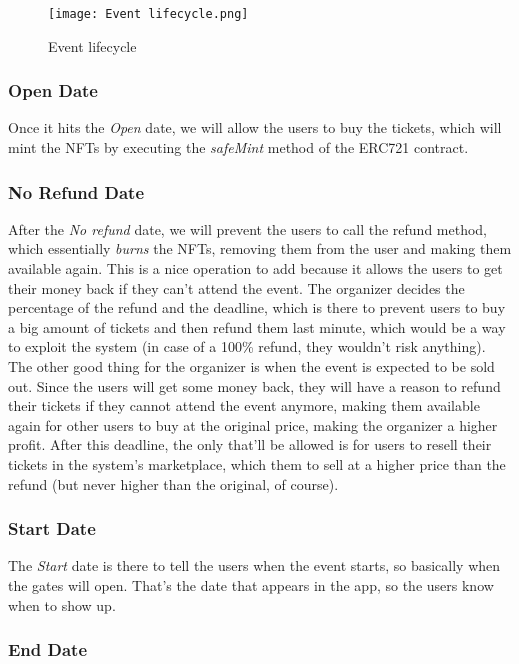 \begin{figure}[H]
    \texttt{[image: Event lifecycle.png]}
    \centering
    \caption{Event lifecycle}
    \label{fig:event_lifecycle}
\end{figure}

\subsubsection{Open Date}

Once it hits the \textit{Open} date, we will allow the users to buy the tickets, which will mint the NFTs by executing the \textit{safeMint} method of the ERC721 contract.

\subsubsection{No Refund Date}

After the \textit{No refund} date, we will prevent the users to call the refund method, which essentially \textit{burns} the NFTs, removing them from the user and making them available again.
This is a nice operation to add because it allows the users to get their money back if they can't attend the event. The organizer decides the percentage of the refund and the deadline, which is there to prevent users to buy a big amount of tickets and then refund them last minute, which would be a way to exploit the system (in case of a 100\% refund, they wouldn't risk anything).
The other good thing for the organizer is when the event is expected to be sold out. Since the users will get some money back, they will have a reason to refund their tickets if they cannot attend the event anymore, making them available again for other users to buy at the original price, making the organizer a higher profit.
After this deadline, the only that'll be allowed is for users to resell their tickets in the system's marketplace, which them to sell at a higher price than the refund (but never higher than the original, of course).

\subsubsection{Start Date}

The \textit{Start} date is there to tell the users when the event starts, so basically when the gates will open. That's the date that appears in the app, so the users know when to show up.

\subsubsection{End Date}

